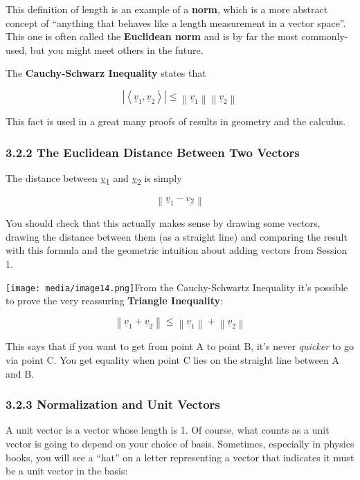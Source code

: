 \documentclass[oneside,english]{amsbook}
\numberwithin{section}{chapter}
\theoremstyle{plain}
\theoremstyle{definition}
\begin{document}
This definition of length is an example of a \textbf{norm}, which is a
more abstract concept of ``anything that behaves like a length
measurement in a vector space''. This one is often called the
\textbf{Euclidean norm} and is by far the most commonly-used, but you
might meet others in the future.

The \textbf{Cauchy-Schwarz Inequality} states that

\[\left| \left\langle {\underline{v}}_{1},{\underline{v}}_{2} \right\rangle \right| \leq \left\| {\underline{v}}_{1} \right\|\left\| {\underline{v}}_{2} \right\|\]

This fact is used in a great many proofs of results in geometry and the
calculus.

\subsubsection{3.2.2 The Euclidean Distance Between Two
	Vectors}\label{the-euclidean-distance-between-two-vectors}

The distance between \ul{v}\textsubscript{1} and \ul{v}\textsubscript{2}
is simply

\[\left\| {\underline{v}}_{1} - \underline{v_{2}} \right\|\]

You should check that this actually makes sense by drawing some vectors,
drawing the distance between them (as a straight line) and comparing the
result with this formula and the geometric intuition about adding
vectors from Session 1.

\texttt{[image: media/image14.png]}From
the Cauchy-Schwartz Inequality it's possible to prove the very
reassuring \textbf{Triangle Inequality}:

\[\left\| {\underline{v}}_{1} + {\underline{v}}_{2} \right\| \leq \left\| {\underline{v}}_{1} \right\| + \left\| {\underline{v}}_{2} \right\|\]

This says that if you want to get from point A to point B, it's never
\emph{quicker} to go via point C. You get equality when point C lies on
the straight line between A and B.

\subsubsection{3.2.3 Normalization and Unit
	Vectors}\label{normalization-and-unit-vectors}

A unit vector is a vector whose length is 1. Of course, what counts as a
unit vector is going to depend on your choice of basis. Sometimes,
especially in physics books, you will see a ``hat'' on a letter
representing a vector that indicates it must be a unit vector in the
basis:
\end{document}
